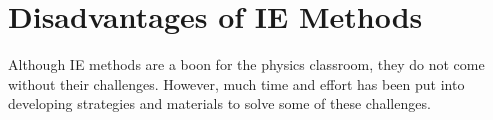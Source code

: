 %
%
%
%
%
%
%
\section{Disadvantages of IE Methods}

Although IE methods are a boon for the physics classroom, they do not come without their challenges. However, much time and effort has been put into developing strategies and materials to solve some of these challenges.

%
%

